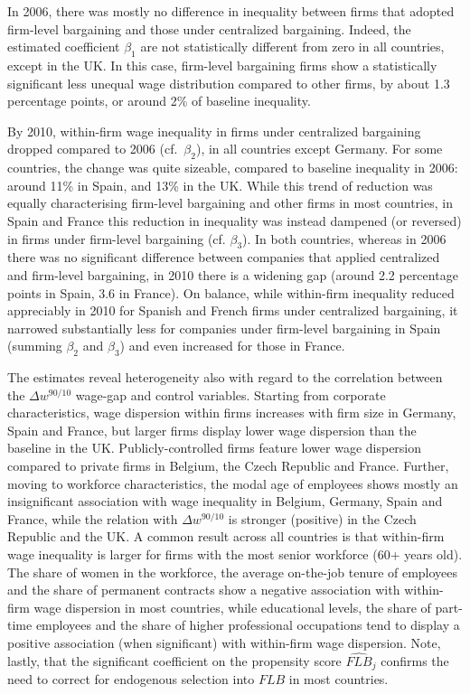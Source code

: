 \documentclass[Review,times,sageh,11pt]{sagej}
\begin{document}
In 2006, there was mostly no difference in inequality between firms that adopted firm-level bargaining and those under centralized bargaining. Indeed, the estimated  coefficient $\beta_1$ are not statistically different from zero in all countries, except in the UK. In this case, firm-level bargaining firms show a statistically significant less unequal wage distribution compared to other firms, by about 1.3 percentage points, or around 2\% of baseline inequality.

By 2010, within-firm wage inequality in firms under centralized bargaining dropped compared to 2006 (cf.~$\beta_2$), in all countries except Germany. For some countries, the change was quite sizeable, compared to baseline inequality in 2006: around 11\% in Spain, and 13\% in the UK. While this trend of reduction was equally characterising firm-level bargaining and other firms in most countries, in Spain and France this reduction in inequality was instead dampened (or reversed) in firms under firm-level bargaining (cf. $\beta_3$). In both countries, whereas in 2006 there was no significant difference between companies that applied centralized and firm-level bargaining, in 2010 there is a widening gap (around 2.2 percentage points in Spain, 3.6 in France). On balance, while within-firm inequality reduced appreciably in 2010 for Spanish and French firms under centralized bargaining, it narrowed substantially less for companies under firm-level bargaining in Spain (summing $\beta_2$ and $\beta_3$) and even increased for those in France. 

The estimates reveal heterogeneity also with regard to the correlation between the $\Delta w^{90/10}$ wage-gap and control variables. Starting from corporate characteristics, wage dispersion within firms increases with firm size in Germany, Spain and France, but larger firms display lower wage dispersion than the baseline in the UK. Publicly-controlled firms feature lower wage dispersion compared to private firms in Belgium, the Czech Republic and France. Further, moving to workforce characteristics, the modal age of employees shows mostly an insignificant association with wage inequality in Belgium, Germany, Spain and France, while the relation with $\Delta w^{90/10}$ is stronger (positive) in the Czech Republic and the UK. A common result across all countries is that within-firm wage inequality is larger for firms with the most senior workforce (60+ years old). The share of women in the workforce, the average on-the-job tenure of employees and the share of permanent contracts show a negative association with within-firm wage dispersion in most countries, while educational levels, the share of part-time employees and the share of higher professional occupations tend to display a positive association (when significant) with within-firm wage dispersion. Note, lastly, that the significant coefficient on the propensity score $\widehat{\mathit{FLB}}_j$ confirms the need to correct for endogenous selection into $\mathit{FLB}$ in most countries.
\end{document}
